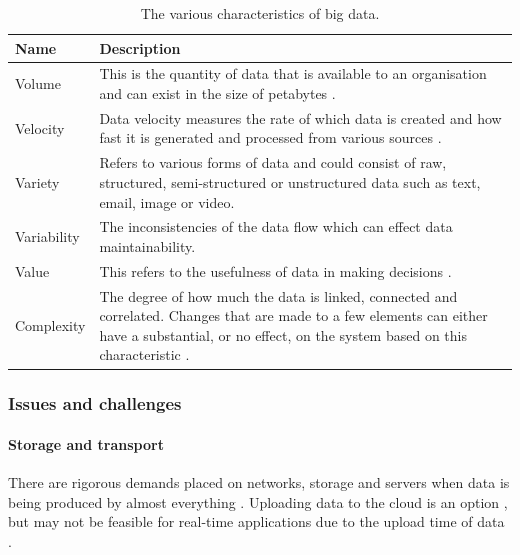 \documentclass[
	fontsize=11pt
	headlines=2,
	footlines=2,
	parskip=half
]{scrartcl}
\begin{document}
{{{				\begin{table}[H]
				\caption{The various characteristics of big data.}
				\begin{tabularx}{\textwidth}{@{}lX@{}}
					\toprule
					\textbf{Name} & \textbf{Description} \\
					\midrule
					Volume & This is the quantity of data that is available to an organisation \citep{kaisler2013big} and can exist in the size of petabytes \citep{katal2013big}. \\
					Velocity & Data velocity measures the rate of which data is created \citep{ferguson2012architecting} and how fast it is generated and processed from various sources \citep{katal2013big}. \\
					Variety & Refers to various forms of data and could consist of raw, structured, semi-structured or unstructured data \citep{ferguson2012architecting} such as text, email, image or video. \\
					Variability & The inconsistencies of the data flow \citep{katal2013big} which can effect data maintainability. \\
					Value & This refers to the usefulness of data in making decisions \citep{kaisler2013big}. \\
					Complexity & The degree of how much the data is linked, connected and correlated. Changes that are made to a few elements can either have a substantial, or no effect, on the system based on this characteristic \citep{kaisler2013big}. \\
					\bottomrule
				\end{tabularx}
				\end{table}
			
			}
			
			\subsubsection{Issues and challenges} {
				
				\paragraph{Storage and transport} {
				
					There are rigorous demands placed on networks, storage and servers when data is being produced by almost everything \citep{katal2013big}. Uploading data to the cloud is an option \citep{katal2013big} \citep{labrinidis2012challenges}, but may not be feasible for real-time applications due to the upload time of data \citep{katal2013big}. 
					
}}}}
\end{document}
